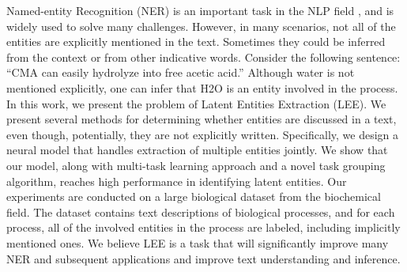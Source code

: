 Named-entity Recognition (NER) is an important task in the NLP field , and is widely used to solve many challenges. However, in many scenarios, not all of the entities are explicitly mentioned in the text. Sometimes they could be inferred from the context or from other indicative words. Consider the following sentence: ``CMA can easily hydrolyze into free acetic acid.'' Although water is not mentioned explicitly, one can infer that H2O is an entity involved in the process. In this work, we present the problem of Latent Entities Extraction (LEE). We present several methods for determining whether entities are discussed in a text, even though, potentially, they are not explicitly written. Specifically, we design a neural model that handles extraction of multiple entities jointly. We show that our model, along with multi-task learning approach and a novel task grouping algorithm, reaches high performance in identifying latent entities. Our experiments are conducted on a large biological dataset from the biochemical field. The dataset contains text descriptions of biological processes, and for each process, all of the involved entities in the process are labeled, including implicitly mentioned ones. We believe LEE is a task that will significantly improve many NER and subsequent applications and improve text understanding and inference.
